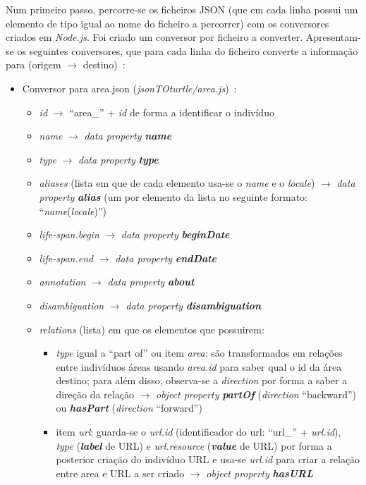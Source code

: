 \documentclass{article}
\begin{document}
Num primeiro passo, percorre-se os ficheiros JSON (que em cada linha possui um elemento de tipo igual ao nome do ficheiro a percorrer) com os conversores criados em \textit{Node.js}. Foi criado um conversor por ficheiro a converter. Apresentam-se os seguintes conversores, que para cada linha do ficheiro converte a informação para (origem $\to$ destino)~\cite{mbSchema,mbRels}:
\begin{itemize}
    \item Conversor para area.json (\textit{jsonTOturtle/area.js})~\cite{mbAr}:
        \begin{itemize}
            \item \textit{id} $\to$ ``area\_'' + \textit{id} de forma a identificar o indivíduo
            \item \textit{name} $\to$ \textit{data property} \textit{\textbf{name}}
            \item \textit{type} $\to$ \textit{data property} \textit{\textbf{type}}
            \item \textit{aliases} (lista em que de cada elemento usa-se o \textit{name} e o \textit{locale}) $\to$ \textit{data property} \textit{\textbf{alias}} (um por elemento da lista no seguinte formato: ``\textit{name}(\textit{locale})'')
            \item \textit{life-span.begin} $\to$ \textit{data property} \textit{\textbf{beginDate}}
            \item \textit{life-span.end} $\to$ \textit{data property} \textit{\textbf{endDate}}
            \item \textit{annotation} $\to$ \textit{data property} \textit{\textbf{about}}
            \item \textit{disambiguation} $\to$ \textit{data property} \textit{\textbf{disambiguation}}
            \item \textit{relations} (lista) em que os elementos que possuirem:
                \begin{itemize}
                    \item \textit{type} igual a ``part of'' ou item \textit{area}: são transformados em relações entre indivíduos áreas usando \textit{area.id} para saber qual o id da área destino; para além disso, observa-se a \textit{direction} por forma a saber a direção da relação $\to$ \textit{object property} \textit{\textbf{partOf}} (\textit{direction} ``backward'') ou \textit{\textbf{hasPart}} (\textit{direction} ``forward'')
                    \item item \textit{url}: guarda-se o \textit{url.id} (identificador do url: ``url\_'' + \textit{url.id}), \textit{type} (\textit{\textbf{label}} de URL) e \textit{url.resource} (\textit{\textbf{value}} de URL) por forma a posterior criação do indivíduo URL e usa-se \textit{url.id} para criar a relação entre area e URL a ser criado $\to$ \textit{object property} \textit{\textbf{hasURL}}

\end{itemize}
\end{itemize}
\end{itemize}
\end{document}
